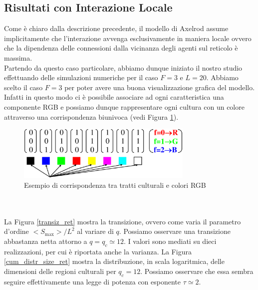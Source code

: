 \documentclass[a4paper,12pt]{article}
\begin{document}
\subsection{Risultati con Interazione Locale}
Come \`e chiaro dalla descrizione precedente, il modello di Axelrod assume implicitamente che l'interazione avvenga esclusivamente in maniera locale ovvero che la dipendenza delle connessioni dalla vicinanza degli agenti sul reticolo \`e massima. 	\\	 
Partendo da questo caso particolare, abbiamo dunque iniziato il nostro studio effettuando delle simulazioni numeriche per il caso $F=3$ e $L=20$.
Abbiamo scelto il caso $F=3$ per poter avere una buona visualizzazione grafica del modello. Infatti in questo modo ci \`{e} possibile associare ad ogni caratteristica una componente RGB e possiamo dunque rappresentare ogni cultura con un colore attraverso una corrispondenza biunivoca (vedi Figura \ref{fig:colors}).
\begin{figure}[!ht]
\centering 
\includegraphics[width=0.75\textwidth]{colors.eps}
\caption{Esempio di corrispondenza tra tratti culturali e colori RGB	\label{fig:colors}}
\end{figure}
\\ \\La Figura \ref{transiz_ret} mostra la transizione, ovvero come varia il parametro d'ordine $<S_{\max}>/L^2$ al variare di $q$. 
Possiamo osservare una transizione abbastanza netta attorno a $q = q_c \simeq 12$. I valori sono mediati su dieci realizzazioni, 
per cui \`{e} riportata anche la varianza.
La Figura \ref{cum_distr_size_ret} mostra la distribuzione, in scala logaritmica, delle dimensioni delle regioni culturali 
per $q_c = 12$. Possiamo osservare che essa sembra seguire effettivamente una legge di potenza con esponente $\tau \simeq 2$.
\end{document}
